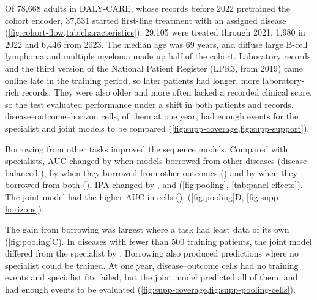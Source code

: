 
\FloatBarrier
{}

Of 78,668 adults in DALY-CARE, whose records before 2022 pretrained the cohort
encoder, 37,531 started first-line treatment with an assigned disease
(\cref{fig:cohort-flow,tab:characteristics}): 29,105 were treated through 2021,
1,980 in 2022 and 6,446 from 2023. The median age was 69 years, and diffuse
large B-cell lymphoma and multiple myeloma made up half of the cohort.
Laboratory records and the third version of the National Patient Register
(LPR3, from 2019) came online late in the training period, so later patients had
longer, more laboratory-rich records. They were also older and more often lacked
a recorded clinical score, so the test evaluated performance under a shift in
both patients and records.  disease--outcome--horizon
cells,  of them at one year, had enough events for the
specialist and joint models to be compared
(\cref{fig:supp-coverage,fig:supp-support}). 

\FloatBarrier
{}
Borrowing from other tasks improved the sequence models. Compared with
specialists, AUC changed by  when models borrowed from other
diseases (disease-balanced ), by
 when they borrowed from other outcomes
() and by  when they
borrowed from both (). IPA changed by
,  and 
(\cref{fig:pooling}, \cref{tab:panel-effects}). The joint model had the higher
AUC in  cells ().  (\cref{fig:pooling}D, \cref{fig:supp-horizons}).

The gain from borrowing was largest where a task had least data of its own
 (\cref{fig:pooling}C). In diseases with fewer
than 500 training patients, the joint model differed from the specialist by
. Borrowing also produced predictions where no
specialist could be trained. At one year, 
disease--outcome cells had no training events and 
specialist fits failed, but the joint model predicted all of them, and
 had enough events to be evaluated
(\cref{fig:supp-coverage,fig:supp-pooling-cells}).

